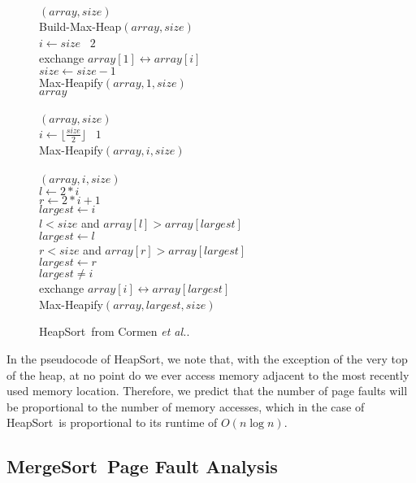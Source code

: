 \documentclass[11pt]{article}
\newcommand{\heapsort}{{\sc HeapSort}}
\newcommand{\mergesort}{{\sc MergeSort}}
\begin{document}
\begin{figure}
\begin{algorithm}
$(array, size)$\+\\
    Build-Max-Heap$(array, size)$\\
    \For $i \gets size$ \DownTo\ $2$\+\\
        exchange $array[1] \leftrightarrow array[i]$\\
        $size \gets size - 1$\\
        Max-Heapify$(array, 1, size)$\-\\
    \Return $array$\-\\
\\
$(array, size)$\+\\
    \For $i \gets \lfloor \frac{size}{2} \rfloor$ \DownTo\ $1$\+\\
        Max-Heapify$(array, i, size)$\-\-\\
\\
$(array, i, size)$\+\\
    $l \gets 2*i$\\
    $r \gets 2*i + 1$\\
    $largest \gets i$\\
    \If $l < size$ and $array[l] > array[largest]$\+\\
            $largest \gets l$\-\\
    \If $r < size$ and $array[r] > array[largest]$\+\\
            $largest \gets r$\-\\
    \If $largest \neq i$\+\\
        exchange $array[i] \leftrightarrow array[largest]$\\
        Max-Heapify$(array, largest, size)$
\end{algorithm}

\caption{\heapsort\ from Cormen {\it et al.}\cite{clrs}.}
\label{fig:hsort}
\end{figure}

In the pseudocode of \heapsort, we note that, with the exception of the very
top of the heap, at no point do we ever access memory adjacent to the most
recently used memory location.  Therefore, we predict that the number of page
faults will be proportional to the number of memory accesses, which in the case
of \heapsort\ is proportional to its runtime of $O(n \log n)$.

\subsection{\mergesort\ Page Fault Analysis} 
\end{document}
